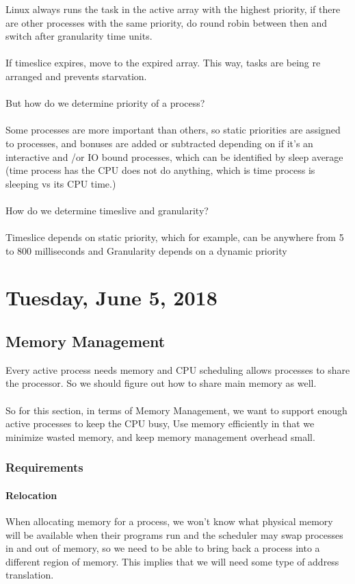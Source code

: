 \documentclass{article}
\begin{document}
Linux always runs the task in the active array with the highest priority, if there are other processes with the same priority, do round robin between then and switch after granularity time units.\\
\\
If timeslice expires, move to the expired array. This way, tasks are being re arranged and prevents starvation.\\
\\
But how do we determine priority of a process?\\
\\
Some processes are more important than others, so static priorities are assigned to processes, and bonuses are added or subtracted depending on if it's an interactive and \slash or IO bound processes, which can be identified by sleep average (time process has the CPU does not do anything, which is time process is sleeping vs its CPU time.)
\\
\\
How do we determine timeslive and granularity?
\\
\\
Timeslice depends on static priority, which for example, can be anywhere from 5 to 800 milliseconds and Granularity depends on a dynamic priority

\newpage

\section{Tuesday, June 5, 2018}

\subsection{Memory Management}

Every active process needs memory and CPU scheduling allows processes to share the processor. So we should figure out how to share main memory as well.\\
\\
So for this section, in terms of Memory Management, we want to support enough active processes to keep the CPU busy, Use memory efficiently in that we minimize wasted memory, and keep memory management overhead small.

\subsubsection{Requirements}

\paragraph{Relocation} When allocating memory for a process, we won't know what physical memory will be available when their programs run and the scheduler may swap processes in and out of memory, so we need to be able to bring back a process into a different region of memory. This implies that we will need some type of address translation.
\end{document}
